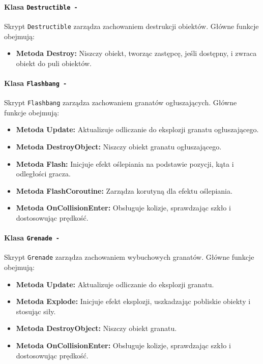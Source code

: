 \paragraph{Klasa \texttt{Destructible -}}
Skrypt \texttt{Destructible} zarządza zachowaniem destrukcji obiektów. Główne funkcje obejmują:
\begin{itemize}
  \item \textbf{Metoda Destroy:} Niszczy obiekt, tworząc zastępcę, jeśli dostępny, i zwraca obiekt do puli obiektów.
\end{itemize}

\paragraph{Klasa \texttt{Flashbang -}}
Skrypt \texttt{Flashbang} zarządza zachowaniem granatów ogłuszających. Główne funkcje obejmują:
\begin{itemize}
  \item \textbf{Metoda Update:} Aktualizuje odliczanie do eksplozji granatu ogłuszającego.
  \item \textbf{Metoda DestroyObject:} Niszczy obiekt granatu ogłuszającego.
  \item \textbf{Metoda Flash:} Inicjuje efekt oślepiania na podstawie pozycji, kąta i odległości gracza.
  \item \textbf{Metoda FlashCoroutine:} Zarządza korutyną dla efektu oślepiania.
  \item \textbf{Metoda OnCollisionEnter:} Obsługuje kolizje, sprawdzając szkło i dostosowując prędkość.
\end{itemize}

\paragraph{Klasa \texttt{Grenade -}}
Skrypt \texttt{Grenade} zarządza zachowaniem wybuchowych granatów. Główne funkcje obejmują:
\begin{itemize}
  \item \textbf{Metoda Update:} Aktualizuje odliczanie do eksplozji granatu.
  \item \textbf{Metoda Explode:} Inicjuje efekt eksplozji, uszkadzając pobliskie obiekty i stosując siły.
  \item \textbf{Metoda DestroyObject:} Niszczy obiekt granatu.
  \item \textbf{Metoda OnCollisionEnter:} Obsługuje kolizje, sprawdzając szkło i dostosowując prędkość.
\end{itemize}

